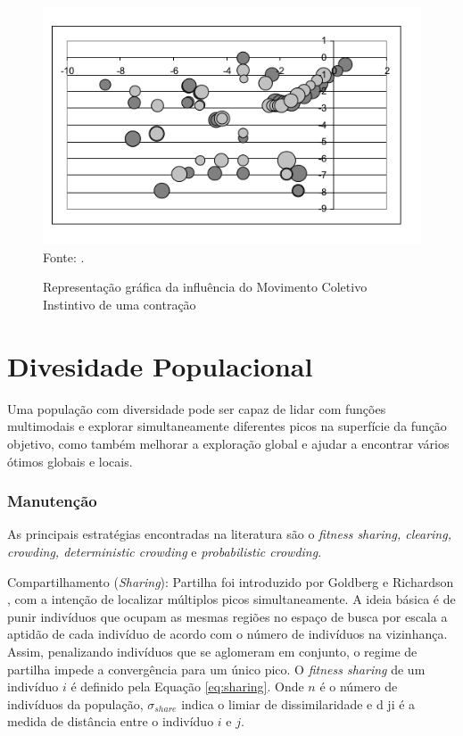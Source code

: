 \begin{figure}[!htb]
	\caption{Representação gráfica da influência do Movimento Coletivo Instintivo de uma contração}
	\centering
	\includegraphics[scale=0.5]{images/movimento_volatil.png}
	\label{fig:volitute_moviment}{\\Fonte: .}
\end{figure}

\section{Divesidade Populacional}
\label{sec:population_diversity}
Uma população com diversidade pode ser capaz de lidar com funções multimodais e explorar simultaneamente diferentes picos na superfície da função objetivo, como também melhorar a exploração global e ajudar a encontrar vários ótimos globais e locais.

\subsubsection{Manutenção}
\label{sec:maintain_diversity}
As principais estratégias encontradas na literatura são o \textit{fitness sharing, clearing, crowding, deterministic crowding} e \textit{probabilistic crowding}.

Compartilhamento (\textit{Sharing}): Partilha foi introduzido por Goldberg e Richardson \cite{sharing}, com a intenção de localizar múltiplos picos simultaneamente. A ideia básica é de punir indivíduos que ocupam as mesmas regiões no espaço de busca por escala a aptidão de cada indivíduo de acordo com o número de indivíduos na vizinhança. Assim, penalizando indivíduos que se aglomeram em conjunto, o regime de partilha impede a convergência para um único pico. O \textit{fitness sharing} de um indivíduo $i$ é definido pela Equação \ref{eq:sharing}. Onde $n$ é o número de indivíduos da população, $\sigma_{share}$ indica o limiar de dissimilaridade e d ji é a medida de distância entre o indivíduo $i$ e $j$.

